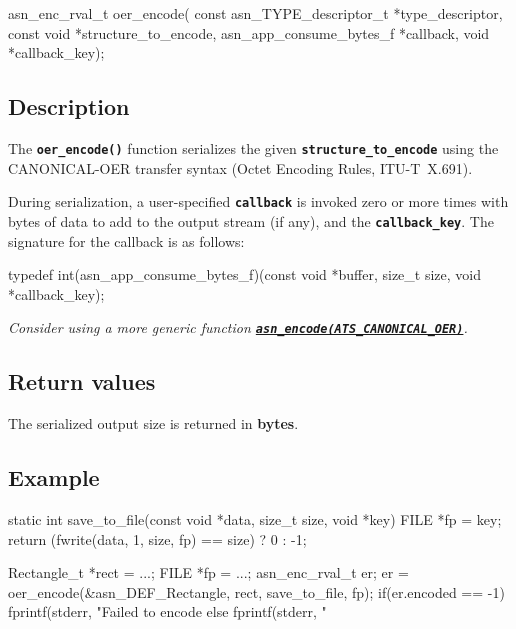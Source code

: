 \documentclass[english,oneside,12pt]{book}
\newcommand{\api}[2]{\hyperref[#1]{\code{#2}}}
\newcommand{\code}[1]{\texttt{\textbf{\lstinline{#1}}}}
\begin{document}
\begin{signature}
asn_enc_rval_t oer_encode(
    const asn_TYPE_descriptor_t *type_descriptor,
    const void *structure_to_encode,
    asn_app_consume_bytes_f *callback,
    void *callback_key);
\end{signature}

\subsection*{Description}

The \code{oer_encode()} function serializes the given \code{structure_to_encode} using the CANONICAL-OER transfer syntax (Octet Encoding Rules, ITU-T~X.691).

During serialization, a user-specified \code{callback} is invoked zero
or more times with bytes of data to add to the output stream (if any), and
the \code{callback_key}. The signature for the callback is as follows:

\begin{signature}
typedef int(asn_app_consume_bytes_f)(const void *buffer, size_t size, void *callback_key);
\end{signature}

\noindent\emph{Consider using a more generic function \api{sec:asn_encode}{asn_encode(ATS_CANONICAL_OER)}.}

\subsection*{Return values}


The serialized output size is returned in \textbf{bytes}.

\subsection*{Example}
\begin{example}
static int
save_to_file(const void *data, size_t size, void *key) {
    FILE *fp = key;
    return (fwrite(data, 1, size, fp) == size) ? 0 : -1;
}

Rectangle_t *rect = ...;
FILE *fp = ...;
asn_enc_rval_t er;
er = oer_encode(&asn_DEF_Rectangle, rect, save_to_file, fp);
if(er.encoded == -1) {
   fprintf(stderr, "Failed to encode %
} else {
   fprintf(stderr, "%
}
\end{example}
\end{document}
